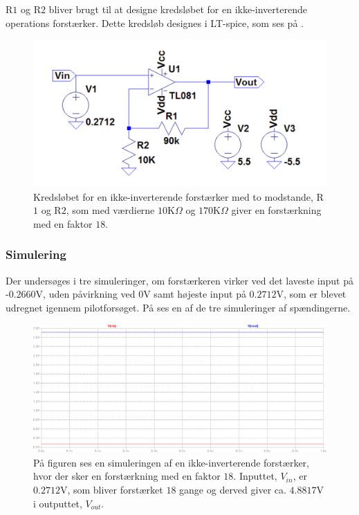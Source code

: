 \noindent R$1$ og R$2$ bliver brugt til at designe kredsløbet for en ikke-inverterende operations forstærker. Dette kredsløb designes i LT-spice, som ses på . 
\begin{figure}[H]
\centering
\includegraphics[scale=0.5]{figures/cProblemloesning/Forstaerker_faktor18.PNG}
\caption{Kredsløbet for en ikke-inverterende forstærker med to modstande, R$1$ og R$2$, som med værdierne $10$K$\Omega$ og $170$K$\Omega$ giver en forstærkning med en faktor $18$.}
\label{fig:Forstaerker_faktor18}
\end{figure} 

\subsubsection{Simulering}\label{Subsec:Forstaerker_simu}
Der undersøges i tre simuleringer, om forstærkeren virker ved det laveste input på -$0.2660$V, uden påvirkning ved $0$V samt højeste input på $0.2712$V, som er blevet udregnet igennem pilotforsøget. På  ses en af de tre simuleringer af spændingerne.

\begin{figure}[H]
\centering
\includegraphics[scale=0.4]{figures/cProblemloesning/Forstaerker_faktor18_simulering.PNG}
\caption{På figuren ses en simuleringen af en ikke-inverterende forstærker, hvor der sker en forstærkning med en faktor $18$. Inputtet, $V_{in}$, er $0.2712$V, som bliver forstærket $18$ gange og derved giver ca. $4.8817$V i outputtet, $V_{out}$.}
\label{fig:Forstaerker_faktor18_simulering}
\end{figure}

